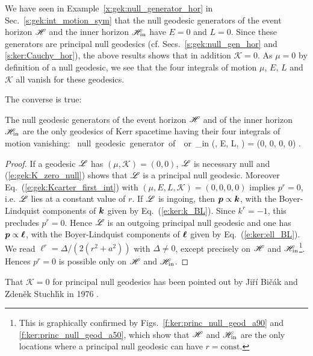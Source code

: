 \begin{example}
We have seen in Example~\ref{x:gek:null_generator_hor} in Sec.~\ref{s:gek:int_motion_sym}
that the null geodesic generators of the event horizon $\mathscr{H}$ and the
inner horizon $\mathscr{H}_{\rm in}$ have $E=0$ and $L=0$.
Since these generators are principal null geodesics (cf.
Secs.~\ref{s:gek:null_gen_hor} and \ref{s:ker:Cauchy_hor}), the above results shows
that in addition $\mathscr{K}=0$. As $\mu=0$ by definition of a null geodesic,
we see that the four integrals of motion $\mu$, $E$, $L$ and $\mathscr{K}$ all
vanish for these geodesics.
\end{example}
The converse is true:
\begin{prop}
The null geodesic generators of the event horizon $\mathscr{H}$ and of the
inner horizon $\mathscr{H}_{\rm in}$ are the only geodesics of Kerr spacetime
having their four integrals of motion vanishing:
\be \label{e:gek:all_const_zero}
\Li \ \mbox{null geodesic generator of}\ \Hor\ \mbox{or}\ \Hor_{\rm in} \iff
(\mu, E, L, ) = (0, 0, 0, 0) .
\ee
\end{prop}
\begin{proof}
If a geodesic $\mathscr{L}$ has $(\mu,\mathscr{K}) = (0,0)$,
$\mathscr{L}$ is necessary null and (\ref{e:gek:K_zero_null}) shows that
$\mathscr{L}$ is a principal null geodesic. Moreover
Eq.~(\ref{e:gek:Kcarter_first_int}) with $(\mu, E, L, \mathscr{K}) = (0, 0, 0, 0)$
implies $p^r = 0$, i.e. $\mathscr{L}$ lies at a constant value of $r$.
If $\mathscr{L}$ is ingoing, then $\bm{p} \propto \bm{k}$, with the Boyer-Lindquist components
of $\bm{k}$ given by Eq.~(\ref{e:ker:k_BL}). Since $k^r = -1$, this precludes
$p^r = 0$. Hence $\mathscr{L}$ is an outgoing principal null geodesic
and one has $\bm{p} \propto \bm{\ell}$, with the Boyer-Lindquist components
of $\bm{\ell}$ given by Eq.~(\ref{e:ker:ell_BL}). We read $\ell^r = \Delta / (2(r^2+a^2))$
with $\Delta\neq 0$, except precisely on $\mathscr{H}$ and
$\mathscr{H}_{\rm in}$\footnote{This is graphically confirmed by
Figs.~\ref{f:ker:princ_null_geod_a90} and
\ref{f:ker:princ_null_geod_a50}, which show that $\mathscr{H}$ and $\mathscr{H}_{\rm in}$ are the only
locations where a principal null geodesic can have $r=\mathrm{const}$.}. Hences
$p^r = 0$ is possible only on $\mathscr{H}$ and $\mathscr{H}_{\rm in}$.
\end{proof}

\begin{hist}
That $\mathscr{K} = 0$ for principal null geodesics has been pointed out
by Ji\v{r}\'{i} Bi\v{c}\'{a}k and
Zden\v{e}k Stuchl\'{\i}k
in 1976 \cite{BicakS76}.
\end{hist}

